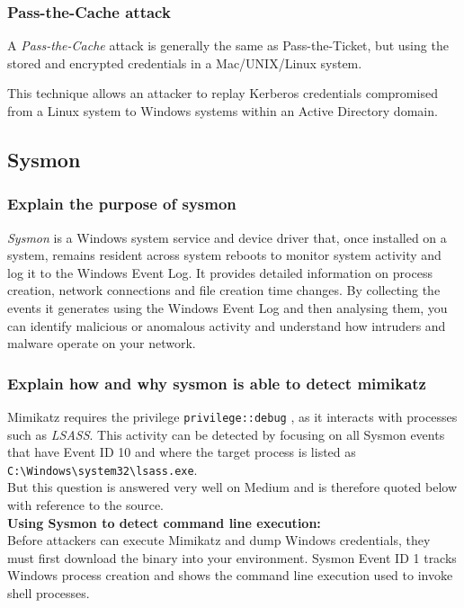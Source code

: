 \subsubsection{Pass-the-Cache attack}
A \textit{Pass-the-Cache} attack is generally the same as Pass-the-Ticket, but using the stored and encrypted credentials in a Mac/UNIX/Linux system.

This technique allows an attacker to replay Kerberos credentials compromised from a Linux system to Windows systems within an Active Directory domain.

\newpage

\subsection{Sysmon}

\subsubsection{Explain the purpose of sysmon}
\textit{Sysmon} is a Windows system service and device driver that, once installed on a system, remains resident across system reboots to monitor system activity and log it to the Windows Event Log. It provides detailed information on process creation, network connections and file creation time changes. By collecting the events it generates using the Windows Event Log and then analysing them, you can identify malicious or anomalous activity and understand how intruders and malware operate on your network.

\subsubsection{Explain how and why sysmon is able to detect mimikatz}
Mimikatz requires the privilege \lstinline|privilege::debug| , as it interacts with processes such as \textit{LSASS}.
This activity can be detected by focusing on all Sysmon events that have Event ID 10 and where the target process is listed as \lstinline|C:\Windows\system32\lsass.exe|.\\

But this question is answered very well on Medium and is therefore quoted below with reference to the source.\\

\textbf{Using Sysmon to detect command line execution:}\\
Before attackers can execute Mimikatz and dump Windows credentials, they must first download the binary into your environment. Sysmon Event ID 1 tracks Windows process creation and shows the command line execution used to invoke shell processes.\\

